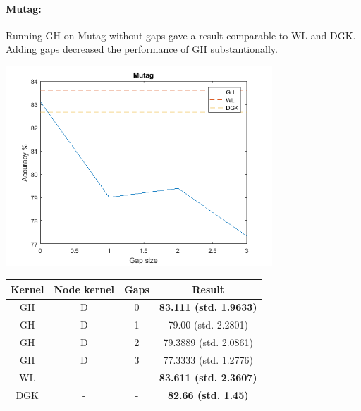 \documentclass{article}
\begin{document}
\paragraph{Mutag:}
Running GH on Mutag without gaps gave a result comparable to WL and DGK. Adding gaps decreased the performance of GH substantionally.\\
\begin{minipage}{0.6\linewidth}
		\hspace*{-1in}
		\includegraphics[width=10cm]{mutag}
		\label{fig:mutag}
\end{minipage}
\begin{minipage}[c]{0.5\linewidth}
	
	\centering
	\begin{tabular}{c|c|c|c}
			Kernel & Node kernel & Gaps &  Result\\
			\hline
			GH & D & 0 & \textbf{83.111 (std. 1.9633)}\\
			GH & D & 1 & 79.00 (std. 2.2801)\\
			GH & D & 2 & 79.3889 (std. 2.0861)\\
			GH & D & 3 &  77.3333 (std. 1.2776)\\
			WL & - & - & \textbf{83.611 (std. 2.3607)}\\
			DGK\cite{yanardag} & - & - & \textbf{82.66 (std. 1.45)}
		\end{tabular}
	\label{table:mutag}
\end{minipage}
\end{document}
